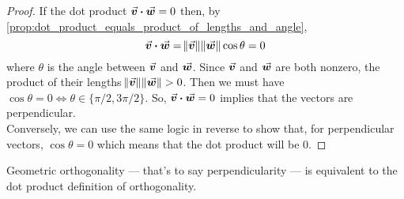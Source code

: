 \documentclass[MathsNotesBase.tex]{subfiles}
\begin{document}
{	
	\begin{proof}
		If the dot product ${ \vec{\bm{v}}\boldsymbol{\cdot}\vec{\bm{w}} = 0 }$ then, by \autoref{prop:dot_product_equals_product_of_lengths_and_angle},
		\[ \vec{\bm{v}}\boldsymbol{\cdot}\vec{\bm{w}} = \norm{\vec{\bm{v}}} \norm{\vec{\bm{w}}} \cos{\theta} = 0 \]
		where $\theta$ is the angle between $\vec{\bm{v}}$ and $\vec{\bm{w}}$. Since $\vec{\bm{v}}$ and $\vec{\bm{w}}$ are both nonzero, the product of their lengths ${ \norm{\vec{\bm{v}}} \norm{\vec{\bm{w}}} > 0 }$. Then we must have ${ \cos{\theta} = 0 \iff \theta \in \{ \pi/2, 3\pi/2 \}  }$. So, ${ \vec{\bm{v}}\boldsymbol{\cdot}\vec{\bm{w}} = 0 }$ implies that the vectors are perpendicular.\\
		Conversely, we can use the same logic in reverse to show that, for perpendicular vectors, ${ \cos{\theta} = 0 }$ which means that the dot product will be 0.
	\end{proof}
	\begin{corollary}
		Geometric orthogonality --- that's to say perpendicularity --- is equivalent to the dot product definition of orthogonality.
	\end{corollary}
}
	
\end{document}
